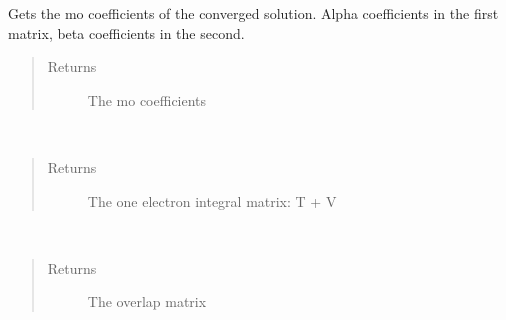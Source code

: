 \documentclass[letterpaper,10pt,english]{sphinxmanual}
\begin{document}
\begin{fulllineitems}
\begin{fulllineitems}
\label{\detokenize{cUHF_b:hf.cUHF_b.CUHF.get_mo_coeff}}
Gets the mo coefficients of the converged solution.
Alpha coefficients in the first matrix, beta coefficients in the second.
\begin{quote}\begin{description}
\item[{Returns}] \leavevmode
The mo coefficients

\end{description}\end{quote}

\end{fulllineitems}


\begin{fulllineitems}
\label{\detokenize{cUHF_b:hf.cUHF_b.CUHF.get_one_e}}~\begin{quote}\begin{description}
\item[{Returns}] \leavevmode
The one electron integral matrix: T + V

\end{description}\end{quote}

\end{fulllineitems}


\begin{fulllineitems}
\label{\detokenize{cUHF_b:hf.cUHF_b.CUHF.get_ovlp}}~\begin{quote}\begin{description}
\item[{Returns}] \leavevmode
The overlap matrix

\end{description}\end{quote}

\end{fulllineitems}



\end{fulllineitems}
\end{document}
